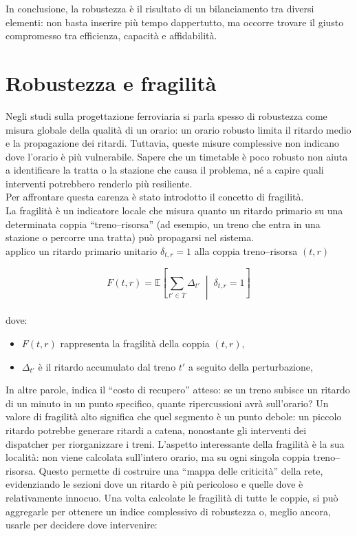 \documentclass[a4paper,12pt]{report}
\begin{document}
    In conclusione, la robustezza è il risultato di un bilanciamento tra diversi elementi: non basta inserire più tempo dappertutto, ma occorre trovare il giusto compromesso tra efficienza, capacità e affidabilità.



\section{Robustezza e fragilità}
Negli studi sulla progettazione ferroviaria si parla spesso di robustezza come misura globale della qualità di un orario: un orario robusto limita il ritardo medio e la propagazione dei ritardi. Tuttavia, queste misure complessive non indicano dove l’orario è più vulnerabile. Sapere che un timetable è poco robusto non aiuta a identificare la tratta o la stazione che causa il problema, né a capire quali interventi potrebbero renderlo più resiliente. \\ Per affrontare questa carenza è stato introdotto il concetto di fragilità. \\ La fragilità è un indicatore locale che misura quanto un ritardo primario su una determinata coppia “treno–risorsa” (ad esempio, un treno che entra in una stazione o percorre una tratta) può propagarsi nel sistema. \\

applico un ritardo primario unitario $\delta_{t,r} = 1$ alla coppia treno--risorsa $(t,r)$


\[F(t,r) = \mathbb{E} \left[ \sum_{t' \in T} \Delta_{t'} \;\middle|\; \delta_{t,r} = 1 \right]\] \\ 

dove:
\begin{itemize}

    \item $F(t,r)$ rappresenta la fragilità della coppia $(t,r)$, 
    
    \item $\Delta_{t'}$ è il ritardo accumulato dal treno $t'$ a seguito della perturbazione,
    
    \end{itemize}
    In altre parole, indica il “costo di recupero” atteso: se un treno subisce un ritardo di un minuto in un punto specifico, quante ripercussioni avrà sull’orario? Un valore di fragilità alto significa che quel segmento è un punto debole: un piccolo ritardo potrebbe generare ritardi a catena, nonostante gli interventi dei dispatcher per riorganizzare i treni.
    L’aspetto interessante della fragilità è la sua località: non viene calcolata sull’intero orario, ma su ogni singola coppia treno–risorsa. Questo permette di costruire una “mappa delle criticità” della rete, evidenziando le sezioni dove un ritardo è più pericoloso e quelle dove è relativamente innocuo. Una volta calcolate le fragilità di tutte le coppie, si può aggregarle per ottenere un indice complessivo di robustezza o, meglio ancora, usarle per decidere dove intervenire: \\
\end{document}
